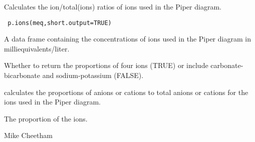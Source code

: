 \begin{Description}\relax
Calculates the ion/total(ions) ratios of ions used in the Piper
diagram.
\end{Description}
\begin{Usage}
\begin{verbatim}
 p.ions(meq,short.output=TRUE)
\end{verbatim}
\end{Usage}
\begin{Arguments}
\begin{ldescription}
\item[\code{meq}] A data frame containing the concentrations of ions used in the
Piper diagram in milliequivalents/liter.
\item[\code{short.output}] Whether to return the proportions of four ions (TRUE)
or include carbonate-bicarbonate and sodium-potassium (FALSE).
\end{ldescription}
\end{Arguments}
\begin{Details}\relax
{} calculates the proportions of anions or cations to total anions
or cations for the ions used in the Piper diagram.
\end{Details}
\begin{Value}
The proportion of the ions.
\end{Value}
\begin{Author}\relax
Mike Cheetham
\end{Author}
\begin{SeeAlso}\relax
{}
\end{SeeAlso}

